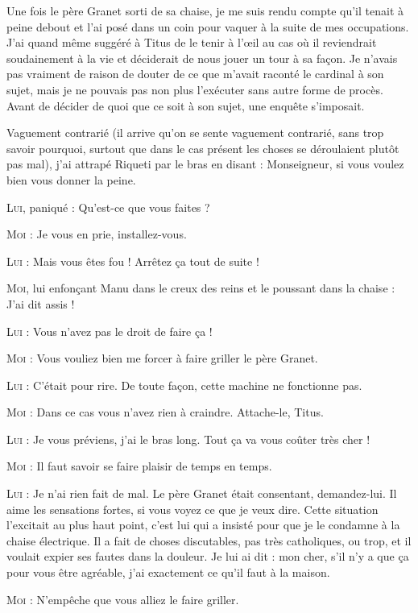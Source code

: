 Une fois le père Granet sorti de sa chaise, je me suis rendu compte qu’il tenait à peine debout et l’ai posé dans un coin pour vaquer à la suite de mes occupations. J’ai quand même suggéré à Titus de le tenir à l’œil au cas où il reviendrait soudainement à la vie et déciderait de nous jouer un tour à sa façon. Je n’avais pas vraiment de raison de douter de ce que m’avait raconté le cardinal à son sujet, mais je ne pouvais pas non plus l’exécuter sans autre forme de procès. Avant de décider de quoi que ce soit à son sujet, une enquête s’imposait.

Vaguement contrarié (il arrive qu’on se sente vaguement contrarié, sans trop savoir pourquoi, surtout que dans le cas présent les choses se déroulaient plutôt pas mal), j’ai attrapé Riqueti par le bras en disant : Monseigneur, si vous voulez bien vous donner la peine.

\textsc{Lui}, paniqué : Qu’est-ce que vous faites ?

\textsc{Moi} : Je vous en prie, installez-vous.

\textsc{Lui} : Mais vous êtes fou ! Arrêtez ça tout de suite !

\textsc{Moi}, lui enfonçant Manu dans le creux des reins et le poussant dans la chaise : J’ai dit assis !

\textsc{Lui} : Vous n’avez pas le droit de faire ça !

\textsc{Moi} : Vous vouliez bien me forcer à faire griller le père Granet.

\textsc{Lui} : C’était pour rire. De toute façon, cette machine ne fonctionne pas.

\textsc{Moi} : Dans ce cas vous n’avez rien à craindre. Attache-le, Titus.

\textsc{Lui} : Je vous préviens, j’ai le bras long. Tout ça va vous coûter très cher !

\textsc{Moi} : Il faut savoir se faire plaisir de temps en temps.

\textsc{Lui} : Je n’ai rien fait de mal. Le père Granet était consentant, demandez-lui. Il aime les sensations fortes, si vous voyez ce que je veux dire. Cette situation l’excitait au plus haut point, c’est lui qui a insisté pour que je le condamne à la chaise électrique. Il a fait de choses discutables, pas très catholiques, ou trop, et il voulait expier ses fautes dans la douleur. Je lui ai dit : mon cher, s’il n’y a que ça pour vous être agréable, j’ai exactement ce qu’il faut à la maison.

\textsc{Moi} : N’empêche que vous alliez le faire griller.

